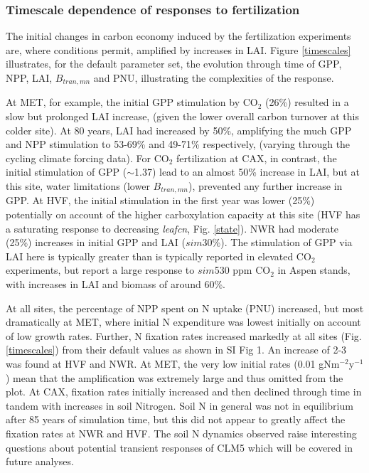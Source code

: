 \documentclass[draft,linenumbers]{agujournal}
\begin{document}
\subsubsection{Timescale dependence of responses to fertilization}
The initial changes in carbon economy induced by the fertilization experiments are, where conditions permit, amplified by increases in LAI. Figure \ref{timescales} illustrates, for the default parameter set, the evolution through time of GPP, NPP, LAI, $B_{tran,mn}$ and PNU, illustrating the complexities of the response. 

 At MET, for example, the initial GPP stimulation by CO$_{2}$ (26\%) resulted in a slow but prolonged LAI increase, (given the lower overall carbon turnover at this colder site). At 80 years, LAI had increased by 50\%, amplifying the much GPP and NPP stimulation to 53-69\% and 49-71\% respectively, (varying through the cycling climate forcing data).  For CO$_{2}$ fertilization at CAX, in contrast, the initial stimulation of GPP ($\sim$1.37) lead to an almost 50\% increase in LAI, but at this site, water limitations (lower $B_{tran,mn}$), prevented any further increase in GPP.  At HVF, the initial stimulation in the first year was lower (25\%) potentially on account of the higher carboxylation capacity at this site (HVF has a saturating response to decreasing \emph{leafcn},  Fig. \ref{state}). NWR had moderate (25\%) increases in initial GPP and LAI ($sim$30\%).  
 The stimulation of GPP via LAI here is typically greater than is typically reported in elevated CO$_{2}$ experiments, but \cite{king2005} report a large response to $sim$530 ppm CO$_{2}$ in Aspen stands, with increases in LAI and biomass of around 60\%.


 At all sites, the percentage of NPP spent on N uptake (PNU) increased, but most dramatically at MET, where initial N expenditure was lowest initially on account of low growth rates.  Further, N fixation rates increased markedly at all sites (Fig. \ref{timescales}) from their default values as shown in SI Fig 1. An increase of 2-3 was found at HVF and NWR. At MET, the very low initial rates (0.01 gNm$^{-2}$y$^{-1}$) mean that the amplification was extremely large and thus omitted from the plot.  At CAX, fixation rates initially increased and then declined through time in tandem with increases in soil Nitrogen. Soil N in general was not in equilibrium after 85 years of simulation time, but this did not appear to greatly affect the fixation rates at NWR and HVF. The soil N dynamics observed raise interesting questions about potential transient responses of CLM5 which will be covered in future analyses. 
\end{document}
